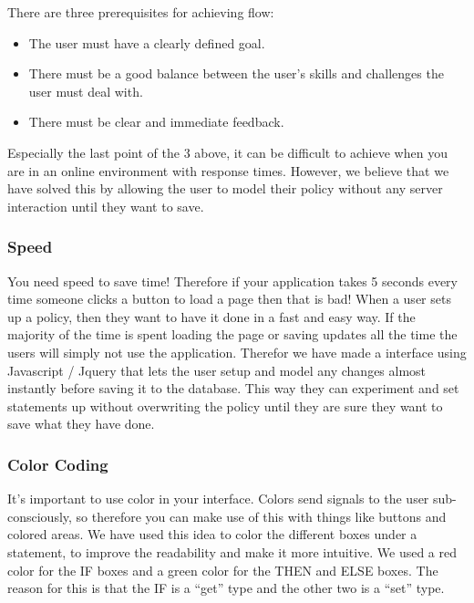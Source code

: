 There are three prerequisites for achieving flow:

\begin{itemize}

  \item The user must have a clearly defined goal.
  \item There must be a good balance between the user's skills and challenges the user must deal with.
  \item There must be clear and immediate feedback.

\end{itemize}

Especially the last point of the 3 above, it can be difficult to achieve when you are in an online environment with response times. However, we believe that we have solved this by allowing the user to model their policy without any server interaction until they want to save.

\subsubsection{Speed}
You need speed to save time! Therefore if your application takes 5 seconds every time someone clicks a button to load a page then that is bad! When a user sets up a policy, then they want to have it done in a fast and easy way. If the majority of the time is spent loading the page or saving updates all the time the users will simply not use the application. Therefor we have made a interface using Javascript / Jquery that lets the user setup and model any changes almost instantly before saving it to the database. This way they can experiment and set statements up without overwriting the policy until they are sure they want to save what they have done.

\subsubsection{Color Coding}
It's important to use color in your interface. Colors send signals to the user sub-consciously, so therefore you can make use of this with things like buttons and colored areas. We have used this idea to color the different boxes under a statement, to improve the readability and make it more intuitive. We used a red color for the IF boxes and a green color for the THEN and ELSE boxes. The reason for this is that the IF is a "`get"' type and the other two is a "`set"' type.

